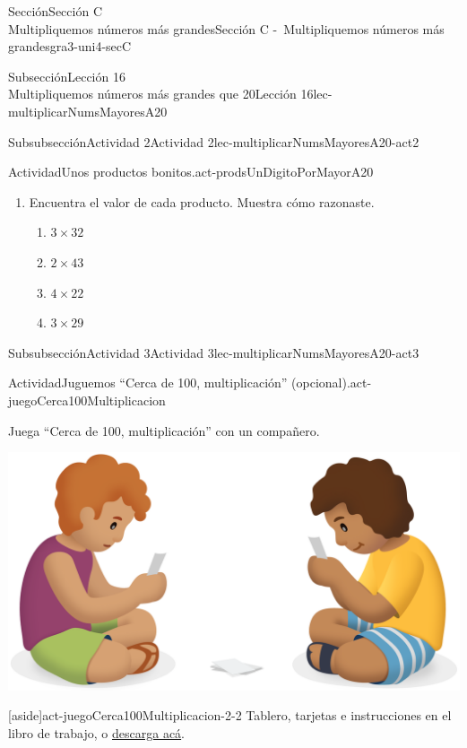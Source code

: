 \begin{sectionptx}{Sección}{{\Large Sección C\\}Multipliquemos números más grandes}{}{Sección C -~Multipliquemos números más grandes}{}{}{gra3-uni4-secC}
\begin{subsectionptx}{Subsección}{{\normalsize Lección 16\\[-0.05cm]}Multipliquemos números más grandes que 20}{}{Lección 16}{}{}{lec-multiplicarNumsMayoresA20}
\begin{subsubsectionptx}{Subsubsección}{Actividad 2}{}{Actividad 2}{}{}{lec-multiplicarNumsMayoresA20-act2}
\begin{activity}{Actividad}{Unos productos bonitos.}{act-prodsUnDigitoPorMayorA20}
\begin{enumerate}
\clearpage
\item{}Encuentra el valor de cada producto. Muestra cómo razonaste.%
%
\begin{enumerate}
\item{}\(\displaystyle 3\times 32\)%
\item{}\(\displaystyle 2\times 43\)%
\item{}\(\displaystyle 4\times 22\)%
\item{}\(\displaystyle 3\times 29\)%
\end{enumerate}
\end{enumerate}
\end{activity}%
\end{subsubsectionptx}
%
%
\typeout{************************************************}
\typeout{************************************************}
%
\begin{subsubsectionptx}{Subsubsección}{Actividad 3}{}{Actividad 3}{}{}{lec-multiplicarNumsMayoresA20-act3}
\begin{activity}{Actividad}{Juguemos “Cerca de 100, multiplicación” (opcional).}{act-juegoCerca100Multiplicacion}%
\begin{sidebyside}{2}{0.05}{0.05}{0.1}%
\begin{sbspanel}{0.5}%
Juega “Cerca de 100, multiplicación” con un compañero.%
\end{sbspanel}%
\begin{sbspanel}{0.3}%
\includegraphics[max width=\linewidth, center]{external/png-source/CS 3.4 Lesson 16 Activity 2.png}
\end{sbspanel}%
\end{sidebyside}%
\begin{aside}{[aside]}{}{act-juegoCerca100Multiplicacion-2-2}%
Tablero, tarjetas e instrucciones en el libro de trabajo, o \href{external/act-pdf/act-juegoCerca100Multiplicacion.pdf}{descarga acá}\footnotemark{}.%

\end{aside}
\end{activity}
\end{subsubsectionptx}
\end{subsectionptx}
\end{sectionptx}
